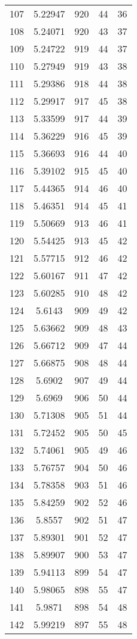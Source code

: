 \documentclass[12pt,a4paper]{article}
\begin{document}
\begin{tabular}{r|cccc}
	107 & 5.22947 & 920 & 44 & 36 \\
	108 & 5.24071 & 920 & 43 & 37 \\
	109 & 5.24722 & 919 & 44 & 37 \\
	110 & 5.27949 & 919 & 43 & 38 \\
	111 & 5.29386 & 918 & 44 & 38 \\
	112 & 5.29917 & 917 & 45 & 38 \\
	113 & 5.33599 & 917 & 44 & 39 \\
	114 & 5.36229 & 916 & 45 & 39 \\
	115 & 5.36693 & 916 & 44 & 40 \\
	116 & 5.39102 & 915 & 45 & 40 \\
	117 & 5.44365 & 914 & 46 & 40 \\
	118 & 5.46351 & 914 & 45 & 41 \\
	119 & 5.50669 & 913 & 46 & 41 \\
	120 & 5.54425 & 913 & 45 & 42 \\
	121 & 5.57715 & 912 & 46 & 42 \\
	122 & 5.60167 & 911 & 47 & 42 \\
	123 & 5.60285 & 910 & 48 & 42 \\
	124 & 5.6143 & 909 & 49 & 42 \\
	125 & 5.63662 & 909 & 48 & 43 \\
	126 & 5.66712 & 909 & 47 & 44 \\
	127 & 5.66875 & 908 & 48 & 44 \\
	128 & 5.6902 & 907 & 49 & 44 \\
	129 & 5.6969 & 906 & 50 & 44 \\
	130 & 5.71308 & 905 & 51 & 44 \\
	131 & 5.72452 & 905 & 50 & 45 \\
	132 & 5.74061 & 905 & 49 & 46 \\
	133 & 5.76757 & 904 & 50 & 46 \\
	134 & 5.78358 & 903 & 51 & 46 \\
	135 & 5.84259 & 902 & 52 & 46 \\
	136 & 5.8557 & 902 & 51 & 47 \\
	137 & 5.89301 & 901 & 52 & 47 \\
	138 & 5.89907 & 900 & 53 & 47 \\
	139 & 5.94113 & 899 & 54 & 47 \\
	140 & 5.98065 & 898 & 55 & 47 \\
	141 & 5.9871 & 898 & 54 & 48 \\
	142 & 5.99219 & 897 & 55 & 48 \\

\end{tabular}
\end{document}
